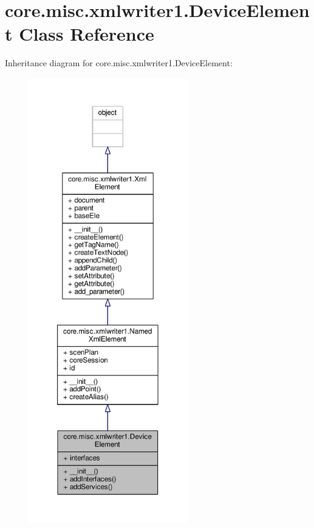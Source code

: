 \hypertarget{classcore_1_1misc_1_1xmlwriter1_1_1_device_element}{\section{core.\+misc.\+xmlwriter1.\+Device\+Element Class Reference}
\label{classcore_1_1misc_1_1xmlwriter1_1_1_device_element}
}


Inheritance diagram for core.\+misc.\+xmlwriter1.\+Device\+Element\+:
\nopagebreak
\begin{figure}[H]
\begin{center}
\leavevmode
\includegraphics[height=550pt]{classcore_1_1misc_1_1xmlwriter1_1_1_device_element__inherit__graph}
\end{center}
\end{figure}


